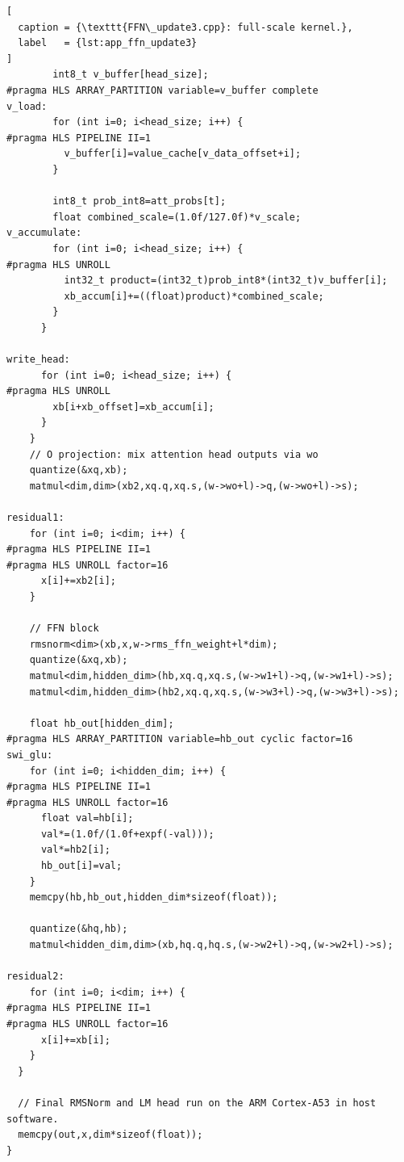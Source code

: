 \begin{appendices}
\begin{lstlisting}[
  caption = {\texttt{FFN\_update3.cpp}: full-scale kernel.},
  label   = {lst:app_ffn_update3}
]
        int8_t v_buffer[head_size];
#pragma HLS ARRAY_PARTITION variable=v_buffer complete
v_load:
        for (int i=0; i<head_size; i++) {
#pragma HLS PIPELINE II=1
          v_buffer[i]=value_cache[v_data_offset+i];
        }

        int8_t prob_int8=att_probs[t];
        float combined_scale=(1.0f/127.0f)*v_scale;
v_accumulate:
        for (int i=0; i<head_size; i++) {
#pragma HLS UNROLL
          int32_t product=(int32_t)prob_int8*(int32_t)v_buffer[i];
          xb_accum[i]+=((float)product)*combined_scale;
        }
      }

write_head:
      for (int i=0; i<head_size; i++) {
#pragma HLS UNROLL
        xb[i+xb_offset]=xb_accum[i];
      }
    }
    // O projection: mix attention head outputs via wo
    quantize(&xq,xb);
    matmul<dim,dim>(xb2,xq.q,xq.s,(w->wo+l)->q,(w->wo+l)->s);

residual1:
    for (int i=0; i<dim; i++) {
#pragma HLS PIPELINE II=1
#pragma HLS UNROLL factor=16
      x[i]+=xb2[i];
    }

    // FFN block
    rmsnorm<dim>(xb,x,w->rms_ffn_weight+l*dim);
    quantize(&xq,xb);
    matmul<dim,hidden_dim>(hb,xq.q,xq.s,(w->w1+l)->q,(w->w1+l)->s);
    matmul<dim,hidden_dim>(hb2,xq.q,xq.s,(w->w3+l)->q,(w->w3+l)->s);

    float hb_out[hidden_dim];
#pragma HLS ARRAY_PARTITION variable=hb_out cyclic factor=16
swi_glu:
    for (int i=0; i<hidden_dim; i++) {
#pragma HLS PIPELINE II=1
#pragma HLS UNROLL factor=16
      float val=hb[i];
      val*=(1.0f/(1.0f+expf(-val)));
      val*=hb2[i];
      hb_out[i]=val;
    }
    memcpy(hb,hb_out,hidden_dim*sizeof(float));

    quantize(&hq,hb);
    matmul<hidden_dim,dim>(xb,hq.q,hq.s,(w->w2+l)->q,(w->w2+l)->s);

residual2:
    for (int i=0; i<dim; i++) {
#pragma HLS PIPELINE II=1
#pragma HLS UNROLL factor=16
      x[i]+=xb[i];
    }
  }

  // Final RMSNorm and LM head run on the ARM Cortex-A53 in host software.
  memcpy(out,x,dim*sizeof(float));
}
\end{lstlisting}

\end{appendices}
